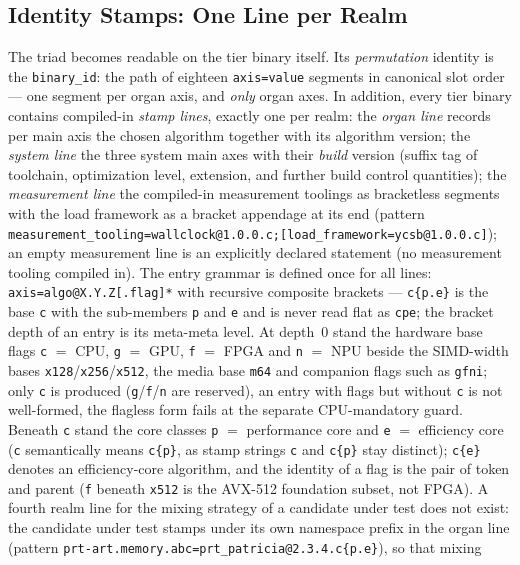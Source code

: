 \begin{nurkurz}
\subsection{Identity Stamps: One Line per Realm}\label{sec:stamp-model}
The triad becomes readable on the tier binary itself. Its \emph{permutation} identity is the
\texttt{binary\_id}: the path of eighteen \texttt{axis=value} segments in canonical slot order --- one
segment per organ axis, and \emph{only} organ axes. In addition, every tier binary contains compiled-in
\emph{stamp lines}, exactly one per realm: the \emph{organ line} records per main axis the chosen
algorithm together with its algorithm version; the \emph{system line} the three system main axes with
their \emph{build} version (suffix tag of toolchain, optimization level, extension, and further build
control quantities); the \emph{measurement line} the compiled-in measurement toolings as bracketless
segments with the load framework as a bracket appendage at its end (pattern
\texttt{measurement\_tooling=wallclock@1.0.0.c;\allowbreak{}[load\_framework=ycsb@1.0.0.c]}); an empty
measurement line is an explicitly declared statement (no measurement tooling compiled in). The entry
grammar is defined once for all lines: \texttt{axis=algo@X.Y.Z[.flag]*} with recursive composite
brackets --- \texttt{c\{p.e\}} is the base \texttt{c} with the sub-members \texttt{p} and \texttt{e}
and is never read flat as \texttt{cpe}; the bracket depth of an entry is its meta-meta level. At depth~0 stand
the hardware base flags \texttt{c} $=$ CPU, \texttt{g} $=$ GPU, \texttt{f} $=$ FPGA and \texttt{n} $=$ NPU
beside the SIMD-width bases \texttt{x128}/\texttt{x256}/\texttt{x512}, the media base \texttt{m64} and
companion flags such as \texttt{gfni}; only \texttt{c} is produced (\texttt{g}/\texttt{f}/\texttt{n} are
reserved), an entry with flags but without \texttt{c} is not well-formed, the flagless form fails at the
separate CPU-mandatory guard. Beneath \texttt{c} stand the core classes \texttt{p} $=$ performance core and
\texttt{e} $=$ efficiency core (\texttt{c} semantically means \texttt{c\{p\}}, as stamp strings \texttt{c}
and \texttt{c\{p\}} stay distinct); \texttt{c\{e\}} denotes an efficiency-core algorithm, and the identity
of a flag is the pair of token and parent (\texttt{f} beneath \texttt{x512} is the AVX-512 foundation
subset, not FPGA). A fourth realm line for the mixing strategy of a
candidate under test does not exist: the candidate under test stamps under its own namespace prefix in
the organ line (pattern \texttt{prt-art.memory.abc=prt\_patricia@2.3.4.c\{p.e\}}), so that mixing

\end{nurkurz}
